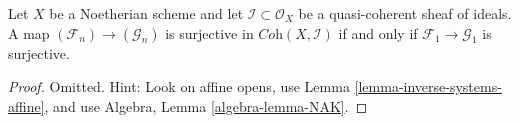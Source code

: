\begin{lemma}
\label{lemma-inverse-systems-surjective}
Let $X$ be a Noetherian scheme and let $\mathcal{I} \subset \mathcal{O}_X$
be a quasi-coherent sheaf of ideals. A map
$(\mathcal{F}_n) \to (\mathcal{G}_n)$ is surjective in
$\textit{Coh}(X, \mathcal{I})$
if and only if $\mathcal{F}_1 \to \mathcal{G}_1$ is surjective.
\end{lemma}

\begin{proof}
Omitted. Hint: Look on affine opens, use
Lemma \ref{lemma-inverse-systems-affine}, and use
Algebra, Lemma \ref{algebra-lemma-NAK}.
\end{proof}
